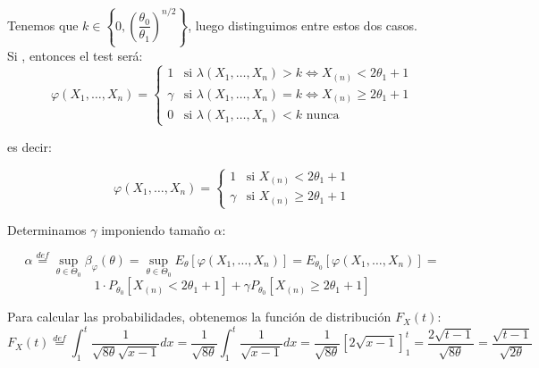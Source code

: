 \documentclass[12pt]{article}
\begin{document}
\begin{ejercicio}
\begin{figure}[H]
        \end{figure}

        Tenemos que $k \in \left\{0, \left( \dfrac{\theta_0}{\theta_1} \right)^{n/2} \right\}$, luego distinguimos entre estos dos casos. \\

        Si , entonces el test será:
        $$\varphi(X_1, \ldots, X_n) = \begin{cases}
            1 &\text{si } \lambda(X_1, \ldots, X_n) > k \iff X_{(n)} < 2\theta_1 + 1 \\
            \gamma &\text{si } \lambda(X_1, \ldots, X_n) = k \iff X_{(n)} \geq 2\theta_1 + 1 \\
            0 &\text{si } \lambda(X_1, \ldots, X_n) < k \text{ nunca}
        \end{cases}$$

        es decir:

        $$\varphi(X_1, \ldots, X_n) = \begin{cases}
            1 &\text{si } X_{(n)} < 2\theta_1 + 1 \\
            \gamma &\text{si } X_{(n)} \geq 2\theta_1 + 1
        \end{cases}$$

        Determinamos $\gamma$ imponiendo tamaño $\alpha$:

        $$\alpha \stackrel{def} = \sup_{\theta \in \Theta_0} \beta_{\varphi}(\theta) =  \sup_{\theta \in \Theta_0} E_\theta[\varphi(X_1, \ldots, X_n)] = E_{\theta_0}[\varphi(X_1, \ldots, X_n)] = $$
        $$1 \cdot P_{\theta_0}[X_{(n)} < 2\theta_1 + 1] + \gamma P_{\theta_0}[X_{(n)} \geq 2\theta_1 + 1] $$

        Para calcular las probabilidades, obtenemos la función de distribución $F_X(t)$:
        $$F_X(t) \stackrel{def}{=} \int_{1}^{t} \dfrac{1}{\sqrt{8\theta}\sqrt{x-1}} dx = \dfrac{1}{\sqrt{8\theta}} \int_{1}^{t} \dfrac{1}{\sqrt{x-1}} dx = \dfrac{1}{\sqrt{8\theta}} \left[ 2 \sqrt{x-1} \right]_1^t = 
        \dfrac{2\sqrt{t-1}}{\sqrt{8\theta}} = 
        \dfrac{\sqrt{t-1}}{\sqrt{2\theta}}$$


\end{ejercicio}
\end{document}
